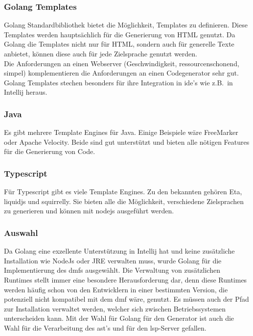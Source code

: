 \documentclass[./einleitung.tex]{subfiles}
\begin{document}
\subsubsection{Golang Templates}
Golang Standardbibliothek bietet die Möglichkeit, Templates zu definieren.
Diese Templates werden hauptsächlich für die Generierung von HTML genutzt.
Da Golang die Templates nicht nur für HTML, sondern auch für generelle Texte anbietet, können diese auch für jede Zielsprache genutzt werden. \\
Die Anforderungen an einen Webserver (Geschwindigkeit, ressourcenschonend, simpel) komplementieren die Anforderungen an einen Codegenerator sehr gut. \\
Golang Templates stechen besonders für ihre Integration in \acrshort{ide}'s wie z.B.\ in Intellij heraus.

\subsubsection{Java}
Es gibt mehrere Template Engines für Java.
Einige Beispiele wäre FreeMarker oder Apache Velocity.
Beide sind gut unterstützt und bieten alle nötigen Features für die Generierung von Code.

\subsubsection{Typescript}
Für Typescript gibt es viele Template Engines.
Zu den bekannten gehören Eta, liquidjs und squirrelly.
Sie bieten alle die Möglichkeit, verschiedene Zielsprachen zu generieren und können mit nodejs ausgeführt werden.

\subsubsection{Auswahl}
Da Golang eine exzellente Unterstützung in Intellij hat und keine zusätzliche Installation wie NodeJs oder JRE verwalten muss, wurde Golang für die Implementierung des \acrshort{dmf}s ausgewählt.
Die Verwaltung von zusätzlichen Runtimes stellt immer eine besondere Herausforderung dar, denn diese Runtimes werden häufig schon von den Entwicklern in einer bestimmten Version, die potenziell nicht kompatibel mit dem \acrshort{dmf} wäre, genutzt.
Es müssen auch der Pfad zur Installation verwaltet werden, welcher sich zwischen Betriebssystemen unterscheiden kann.
\newline
Mit der Wahl für Golang für den Generator ist auch die Wahl für die Verarbeitung des \acrshort{ast}'s und für den \acrlong{lsp}-Server gefallen.
\end{document}
